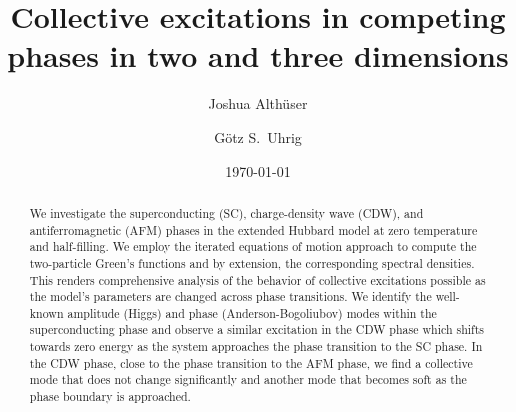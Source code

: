 \documentclass[
    reprint, 
    aps,
    preprintnumbers,
    twocolumn,
    prb,
    superscriptaddress
]{revtex4-2}
\begin{document}
 

\title{Collective excitations in competing phases in two and three dimensions}


\author{Joshua Alth\"user}

\author{G\"otz S.~Uhrig}

\date{\today}

\begin{abstract}
    We investigate the superconducting (SC), charge-density wave (CDW), and antiferromagnetic (AFM) phases 
    in the extended Hubbard model at zero temperature and half-filling.
    We employ the iterated equations of motion approach \cite{Kalthoff17,bleicker18} to compute the two-particle Green's functions and by extension, the corresponding spectral densities.
    This renders comprehensive analysis of the behavior of collective excitations possible as the model's parameters are changed across phase transitions.
    We identify the well-known amplitude (Higgs) and phase (Anderson-Bogoliubov) modes within the superconducting phase and observe a similar excitation in the CDW phase which shifts towards zero energy as the system approaches the phase transition to the SC phase.
    In the CDW phase, close to the phase transition to the AFM phase, we find a collective mode that does not change significantly and another mode that becomes soft as the phase boundary is approached.
\end{abstract}

\maketitle
\end{document}
